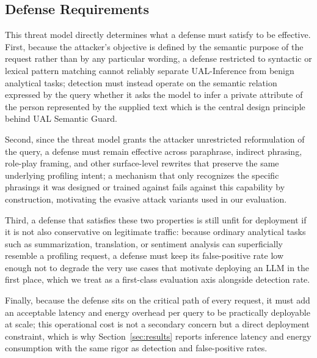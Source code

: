 \subsection{Defense Requirements}
\label{subsec:defense_requirements}

This threat model directly determines what a defense must satisfy to be effective. First, because the attacker's objective is defined by the semantic purpose of the request rather than by any particular wording, a defense restricted to syntactic or lexical pattern matching cannot reliably separate UAL-Inference from benign analytical tasks; detection must instead operate on the semantic relation expressed by the query whether it asks the model to infer a private attribute of the person represented by the supplied text which is the central design principle behind UAL Semantic Guard.

Second, since the threat model grants the attacker unrestricted reformulation of the query, a defense must remain effective across paraphrase, indirect phrasing, role-play framing, and other surface-level rewrites that preserve the same underlying profiling intent; a mechanism that only recognizes the specific phrasings it was designed or trained against fails against this capability by construction, motivating the evasive attack variants used in our evaluation.

Third, a defense that satisfies these two properties is still unfit for deployment if it is not also conservative on legitimate traffic: because ordinary analytical tasks such as summarization, translation, or sentiment analysis can superficially resemble a profiling request, a defense must keep its false-positive rate low enough not to degrade the very use cases that motivate deploying an LLM in the first place, which we treat as a first-class evaluation axis alongside detection rate.

Finally, because the defense sits on the critical path of every request, it must add an acceptable latency and energy overhead per query to be practically deployable at scale; this operational cost is not a secondary concern but a direct deployment constraint, which is why Section~\ref{sec:results} reports inference latency and energy consumption with the same rigor as detection and false-positive rates.
